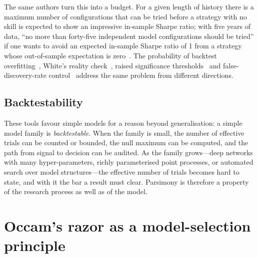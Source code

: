 The same authors turn this into a budget. For a given length of history there is a maximum number of
configurations that can be tried before a strategy with no skill is expected to show an impressive
in-sample Sharpe ratio; with five years of data, ``no more than forty-five independent model
configurations should be tried'' if one wants to avoid an expected in-sample Sharpe ratio of 1 from a
strategy whose out-of-sample expectation is zero~\citep{bailey2014pseudo}. The probability of backtest
overfitting~\citep{bailey2014pbo}, White's reality check~\citep{white2000}, raised significance
thresholds~\citep{harvey2016} and false-discovery-rate control~\citep{benjamini1995} address the same
problem from different directions.

\subsection{Backtestability}

These tools favour simple models for a reason beyond generalisation: a simple model family is
\emph{backtestable}. When the family is small, the number of effective trials can be counted or
bounded, the null maximum can be computed, and the path from signal to decision can be audited. As the
family grows---deep networks with many hyper-parameters, richly parameterised point processes, or
automated search over model structures---the effective number of trials becomes hard to state, and with
it the bar a result must clear. Parsimony is therefore a property of the research process as well as of
the model.

\section{Occam's razor as a model-selection principle}
\label{sec:parsimony}

